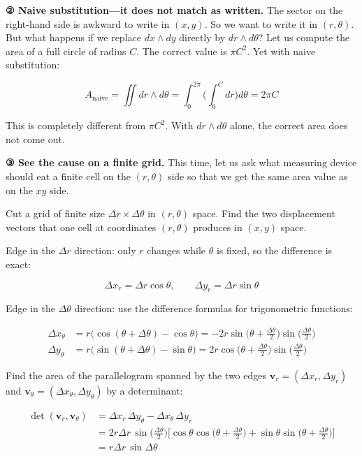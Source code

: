 \documentclass[a4paper,12pt,openany]{book}
\begin{document}
\textbf{② Naive substitution—it does not match as written.} The sector
on the right-hand side is awkward to write in \((x,y)\). So we want to
write it in \((r,\theta)\). But what happens if we replace
\(dx \wedge dy\) directly by \(dr \wedge d\theta\)? Let us compute the
area of a full circle of radius \(C\). The correct value is \(\pi C^2\).
Yet with naive substitution:

\[
A_{\text{naive}}
=
\iint dr \wedge d\theta
=
\int_0^{2\pi}
\biggl(
  \int_0^C dr
\biggr)
d\theta
=
2\pi C
\]

This is completely different from \(\pi C^2\). With
\(dr \wedge d\theta\) alone, the correct area does not come out.

\textbf{③ See the cause on a finite grid.} This time, let us ask what
measuring device should eat a finite cell on the \((r,\theta)\) side so
that we get the same area value as on the \(xy\) side.

Cut a grid of finite size \(\Delta r \times \Delta\theta\) in
\((r,\theta)\) space. Find the two displacement vectors that one cell at
coordinates \((r, \theta)\) produces in \((x,y)\) space.

Edge in the \(\Delta r\) direction: only \(r\) changes while \(\theta\)
is fixed, so the difference is exact:

\[\Delta x_r = \Delta r \cos\theta,\qquad \Delta y_r = \Delta r \sin\theta\]

Edge in the \(\Delta\theta\) direction: use the difference formulas for
trigonometric functions:

\[\begin{aligned}
\Delta x_\theta &= r\bigl(\cos(\theta+\Delta\theta) - \cos\theta\bigr)
= -2r\sin\biggl(\theta+\frac{\Delta\theta}{2}\biggr)\sin\biggl(\frac{\Delta\theta}{2}\biggr) \\[4pt]
\Delta y_\theta &= r\bigl(\sin(\theta+\Delta\theta) - \sin\theta\bigr)
= 2r\cos\biggl(\theta+\frac{\Delta\theta}{2}\biggr)\sin\biggl(\frac{\Delta\theta}{2}\biggr)
\end{aligned}\]

Find the area of the parallelogram spanned by the two edges
\(\mathbf{v}_r = (\Delta x_r, \Delta y_r)\) and
\(\mathbf{v}_\theta = (\Delta x_\theta, \Delta y_\theta)\) by a
determinant:

\[\begin{aligned}
\det(\mathbf{v}_r,\mathbf{v}_\theta) &= \Delta x_r\,\Delta y_\theta - \Delta x_\theta\,\Delta y_r \\
&= 2r\Delta r\,\sin\biggl(\frac{\Delta\theta}{2}\biggr)\biggl[ \cos\theta\cos\biggl(\theta+\frac{\Delta\theta}{2}\biggr) + \sin\theta\sin\biggl(\theta+\frac{\Delta\theta}{2}\biggr) \biggr] \\
&= r\Delta r\,\sin\Delta\theta
\end{aligned}\]
\end{document}
